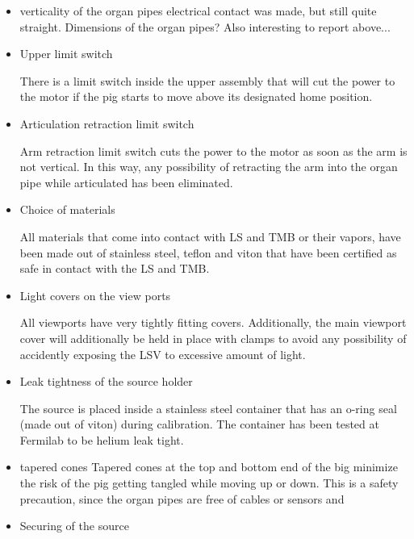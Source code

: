 \begin{itemize}

\item{verticality of the organ pipes}
electrical contact was made, but still quite straight. Dimensions of the organ pipes? Also interesting to report above...


   
\item{Upper limit switch}

There is a limit switch inside the upper assembly that will cut the power to the motor if the pig starts to move above its designated home position.

\item{Articulation retraction limit switch}

Arm retraction limit switch cuts the power to the motor as soon as the arm is not vertical. In this way, any possibility of retracting the arm into the organ pipe while articulated has been eliminated.

\item{Choice of materials}

All materials that come into contact with LS and TMB or their vapors, have been made out of stainless steel, teflon and viton that have been certified as safe in contact with the LS and TMB.


\item{Light covers on the view ports}

All viewports have  very tightly fitting covers. Additionally, the main viewport cover will additionally be held in place with clamps to avoid any possibility of accidently exposing the LSV to excessive amount of light. 
     
\item{Leak tightness of the source holder}

 The source is placed inside a stainless steel container that has an o-ring seal (made out of viton) during calibration. The container has been tested at Fermilab to be helium leak tight.  

\item{tapered cones}
Tapered cones at the top and bottom end of the big minimize the risk of the pig getting tangled while moving up or down. This is a safety precaution, since the organ pipes are free of cables or sensors and 





\item{Securing of the source}


\end{itemize}
